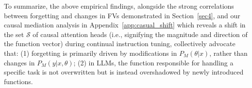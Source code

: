 





To summarize, the above empirical findings, alongside the strong correlations between forgetting and changes in FVs demonstrated in Section~\ref{sec4}, and our causal mediation analysis in Appendix~\ref{app:casual_shift} which reveals a shift in the set \(\mathcal{S}\) of causal attention heads (i.e., signifying the magnitude and direction of the function vector) during continual instruction tuning, collectively advocate that:
(1) forgetting is primarily driven by modifications in \(P_M(\theta|x)\), rather than changes in \(P_M(y|x, \theta)\); (2) in LLMs, the function responsible for handling a specific task is not overwritten but is instead overshadowed by newly introduced functions.
